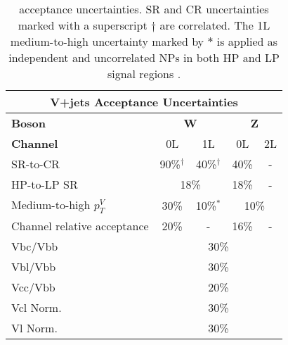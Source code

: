 \begin{table}[!htbp] 
  \footnotesize\centering
  \setlength{\tabcolsep}{0.5em} %
  \begin{tabular}{l|c|c|c|c}
      \toprule\hline
      \multicolumn{5}{c}{V+jets Acceptance Uncertainties}            
      \\ \hline
      \textbf{Boson}      & \multicolumn{2}{c|}{\textbf{W}} & \multicolumn{2}{c}{\textbf{Z}} 
      \\ \hline
      \textbf{Channel}    & 0L          & 1L         & 0L         & 2L          
      \\ \hline
      SR-to-CR               &   90\%$^\dagger$         & 40\%$^\dagger$ &      40\%     & -         
      \\ \hline
      HP-to-LP SR               & \multicolumn{2}{c|}{18\%}             &   18\%      & -         
      \\ \hline
      Medium-to-high $p_T^V$ &   30\%      & 10\%$^*$       & \multicolumn{2}{c}{10\%}          
      \\ \hline
      Channel relative acceptance             &   20\%      &   -        &    16\%    & -
      \\ \hline
      Vbc/Vbb             & \multicolumn{4}{c}{30\%}                       
      \\ \hline
      Vbl/Vbb             & \multicolumn{4}{c}{30\%}                       
      \\ \hline
      Vcc/Vbb             & \multicolumn{4}{c}{20\%}                       
      \\ \hline
      Vcl Norm.           & \multicolumn{4}{c}{30\%}                       
      \\ \hline
      Vl Norm.            & \multicolumn{4}{c}{30\%}                       
      \\ \hline\bottomrule
  \end{tabular}
  \caption{
    \Vjets acceptance uncertainties.
    \Wjets SR and CR uncertainties marked with a superscript $\dagger$ are correlated.
    The 1L \Wjets medium-to-high \pTV uncertainty marked by $*$ is applied as independent and uncorrelated NPs in both HP and LP signal regions  \cite{Dao:2688371}.
  }
  \label{tab:Vjets acceptance uncerts}
\end{table}